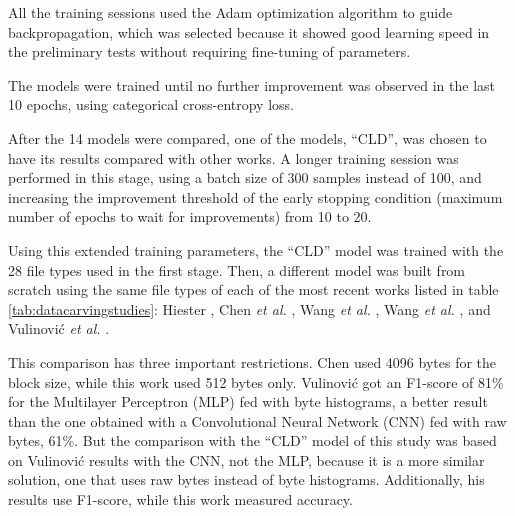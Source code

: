 


All the training sessions used the Adam \cite{kingma_adam:_2014}
optimization algorithm to guide backpropagation, which was selected because it showed good learning speed in the preliminary tests without requiring fine-tuning of parameters.

The models were trained until no further improvement was observed in the last 10 epochs, using categorical cross-entropy loss.

After the 14 models were compared, one of the models, ``CLD'', was chosen to have its results compared with other works. A longer training session was performed in this stage, using a batch size of 300 samples instead of 100, and increasing the improvement threshold of the early stopping condition (maximum number of epochs to wait for improvements) from 10 to 20.

Using this extended training parameters, the ``CLD'' model was trained with the 28 file types used in the first stage. Then, a different model was built from scratch using the same file types of each of the most recent works listed in table \ref{tab:datacarvingstudies}: 
Hiester \cite{hiester_file_2018}, 
Chen \textit{et al.} \cite{chen_file_2018},
Wang \textit{et al.} \cite{wang_sparse_2018},
Wang \textit{et al.} \cite{wang_file_2018},
and
Vulinović \textit{et al.} \cite{vulinovic_neural_2019}.

This comparison has three important restrictions.
Chen used 4096 bytes for the block size, while this work used 512 bytes only.
Vulinović got an F1-score of 81\% for the Multilayer Perceptron (MLP) fed with byte histograms, a better result than the one obtained with a Convolutional Neural Network (CNN) fed with raw bytes, 61\%. But the comparison with the ``CLD'' model of this study was based on Vulinović results with the CNN, not the MLP, because it is a more similar solution, one that uses raw bytes instead of byte histograms. Additionally, his results use F1-score, while this work measured accuracy. 

